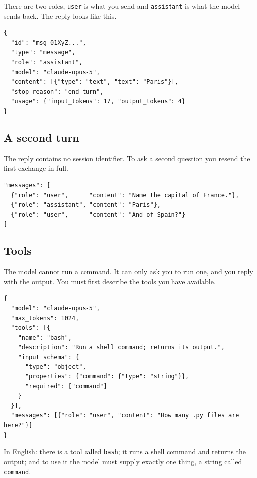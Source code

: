 \documentclass[11pt]{article}
\newenvironment{keep}{\par\addvspace{0.5\baselineskip}\noindent\begin{minipage}{\linewidth}}{\end{minipage}}
\newcommand{\code}[1]{\texttt{#1}}
\begin{document}
There are two roles, \code{user} is what you send and \code{assistant}
is what the model sends back. The reply looks like this.

\begin{keep}
\begin{lstlisting}
{
  "id": "msg_01XyZ...",
  "type": "message",
  "role": "assistant",
  "model": "claude-opus-5",
  "content": [{"type": "text", "text": "Paris"}],
  "stop_reason": "end_turn",
  "usage": {"input_tokens": 17, "output_tokens": 4}
}
\end{lstlisting}
\end{keep}

\subsection{A second turn}

The reply contains no session identifier. To ask a second question you resend the
first exchange in full.

\begin{keep}
\begin{lstlisting}
"messages": [
  {"role": "user",      "content": "Name the capital of France."},
  {"role": "assistant", "content": "Paris"},
  {"role": "user",      "content": "And of Spain?"}
]
\end{lstlisting}
\end{keep}

\subsection{Tools}

The model cannot run a command. It can only ask you to run one, and you reply with
the output. You must first describe the tools you have available.

\begin{keep}
\begin{lstlisting}
{
  "model": "claude-opus-5",
  "max_tokens": 1024,
  "tools": [{
    "name": "bash",
    "description": "Run a shell command; returns its output.",
    "input_schema": {
      "type": "object",
      "properties": {"command": {"type": "string"}},
      "required": ["command"]
    }
  }],
  "messages": [{"role": "user", "content": "How many .py files are here?"}]
}
\end{lstlisting}
\end{keep}

In English: there is a tool called \code{bash}; it runs a shell command
and returns the output; and to use it the model must supply exactly one thing, a
string called \code{command}.
\end{document}
